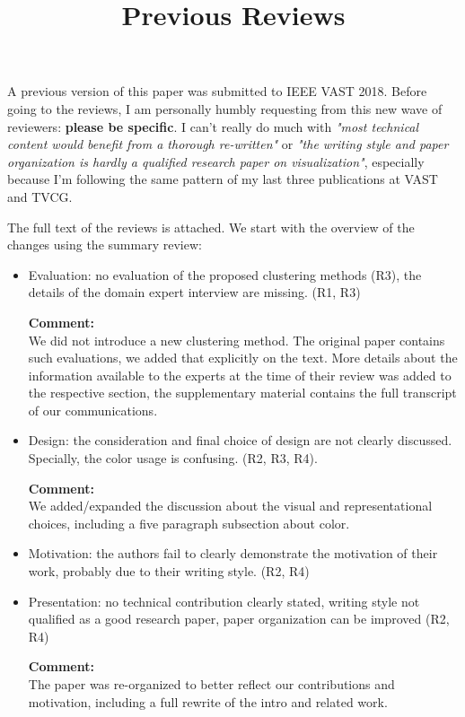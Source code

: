 \documentclass{article}
\title{Previous Reviews}
\newcommand{\reply}[1]{\begin{tcolorbox}\noindent\textbf{Comment:}\\#1\hfill\end{tcolorbox}}
\begin{document}
\maketitle
A previous version of this paper was submitted to IEEE VAST 2018. Before going
to the reviews, I am personally humbly requesting from this new wave of
reviewers: \textbf{please be specific}. I can't really do much with \emph{"most
technical content would benefit from a thorough re-written"} or \emph{"the
writing style and paper organization is hardly a qualified research paper on
visualization"}, especially because I'm following the same pattern of my last
three publications at VAST and TVCG. 
 
The full text of the reviews is attached. We start with the overview of the
changes using the summary review:


\begin{itemize}
    \item{Evaluation: no evaluation of the proposed clustering methods (R3), the details
    of the domain expert interview are missing. (R1, R3)
    
    \reply{We did not introduce a new clustering method. The original paper
    contains such evaluations, we added that explicitly on the text. More
    details about the information available to the experts at the time of their
    review was added to the respective section, the supplementary material
    contains the full transcript of our communications.}}

    \item{Design: the consideration and final choice of design are not clearly discussed.
    Specially, the color usage is confusing. (R2, R3, R4).
    
    \reply{We added/expanded the discussion about the visual and
     representational choices, including a five paragraph subsection about
     color.}}

    \item{Motivation: the authors fail to clearly demonstrate the motivation of their
    work, probably due to their writing style. (R2, R4)}

    \item{Presentation: no technical contribution clearly stated, writing style not
    qualified as a good research paper, paper organization can be improved (R2, R4)

    \reply{The paper was re-organized to better reflect our contributions and
     motivation, including a full rewrite of the intro and related work.}}
     
\end{itemize}
\end{document}
